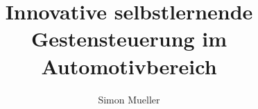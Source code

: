 
\title{Innovative selbstlernende Gestensteuerung im Automotivbereich}
\author{Simon Mueller}


\maketitle
